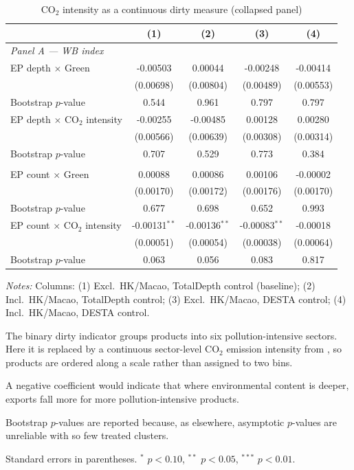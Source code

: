 \begin{table}[htbp]
\centering
\footnotesize
\caption{CO$_2$ intensity as a continuous dirty measure (collapsed panel)}
\label{tab:co2}
\begin{threeparttable}
\begin{tabular}{lcccc}
\toprule
 & (1) & (2) & (3) & (4) \\
\midrule
\multicolumn{5}{l}{\textit{Panel A --- WB index}} \\
\addlinespace
EP depth $\times$ Green & -0.00503 & 0.00044 & -0.00248 & -0.00414 \\
 & (0.00698) & (0.00804) & (0.00489) & (0.00553) \\
\quad Bootstrap $p$-value & 0.544 & 0.961 & 0.797 & 0.797 \\
\addlinespace
EP depth $\times$ CO$_2$ intensity & -0.00255 & -0.00485 & 0.00128 & 0.00280 \\
 & (0.00566) & (0.00639) & (0.00308) & (0.00314) \\
\quad Bootstrap $p$-value & 0.707 & 0.529 & 0.773 & 0.384 \\
\addlinespace
\multicolumn{5}{l}{\textit{Panel B --- TREND index}} \\
\addlinespace
EP count $\times$ Green & 0.00088 & 0.00086 & 0.00106 & -0.00002 \\
 & (0.00170) & (0.00172) & (0.00176) & (0.00170) \\
\quad Bootstrap $p$-value & 0.677 & 0.698 & 0.652 & 0.993 \\
\addlinespace
EP count $\times$ CO$_2$ intensity & -0.00131$^{**}$ & -0.00136$^{**}$ & -0.00083$^{**}$ & -0.00018 \\
 & (0.00051) & (0.00054) & (0.00038) & (0.00064) \\
\quad Bootstrap $p$-value & 0.063 & 0.056 & 0.083 & 0.817 \\
\bottomrule
\end{tabular}
\begin{tablenotes}[flushleft]\footnotesize
\item \emph{Notes:} Columns: (1) Excl.\ HK/Macao, TotalDepth control (baseline); (2) Incl.\ HK/Macao, TotalDepth control; (3) Excl.\ HK/Macao, DESTA control; (4) Incl.\ HK/Macao, DESTA control.
\item The binary dirty indicator groups products into six pollution-intensive sectors. Here it is replaced by a continuous sector-level CO$_2$ emission intensity from \citet{shapiro2021}, so products are ordered along a scale rather than assigned to two bins.
\item A negative coefficient would indicate that where environmental content is deeper, exports fall more for more pollution-intensive products.
\item Bootstrap $p$-values are reported because, as elsewhere, asymptotic $p$-values are unreliable with so few treated clusters.
\item Standard errors in parentheses. $^{*}$ $p<0.10$, $^{**}$ $p<0.05$, $^{***}$ $p<0.01$.
\end{tablenotes}
\end{threeparttable}
\end{table}
